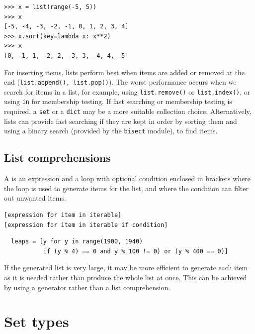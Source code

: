 \begin{lstlisting}
>>> x = list(range(-5, 5))
>>> x
[-5, -4, -3, -2, -1, 0, 1, 2, 3, 4]
>>> x.sort(key=lambda x: x**2)
>>> x
[0, -1, 1, -2, 2, -3, 3, -4, 4, -5]
\end{lstlisting}




For inserting items, lists perform best when items are added or removed at the end (\verb|list.append(), list.pop()|).
The worst performance occurs when we search for items in a list, for example, using \verb|list.remove()| or \verb|list.index()|, or using \verb|in| for membership testing.
If fast searching or membership testing is required, a \verb|set| or a \verb|dict| may be a more suitable collection choice.
Alternatively, lists can provide fast searching if they are kept in order by sorting them and using a binary search (provided by the \verb|bisect| module), to find items. 


\subsection{List comprehensions}

A  is an expression and a loop with optional condition enclosed in brackets where the loop is used to generate items for the list, and where the condition can filter out unwanted items.

\begin{verbatim}
[expression for item in iterable]
[expression for item in iterable if condition]
\end{verbatim}


\begin{lstlisting}
  leaps = [y for y in range(1900, 1940)
           if (y % 4) == 0 and y % 100 != 0) or (y % 400 == 0)]
\end{lstlisting}


If the generated list is very large, it may be more efficient to generate each item as it is needed rather than produce the whole list at once.
This can be achieved by using a generator rather than a list comprehension. 



\section{Set types}

